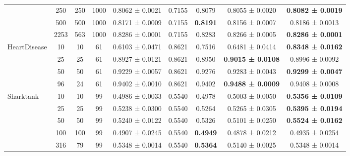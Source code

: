 \begin{table}
{\begin{tabular}[H]{@{}lcccccccc@{}}
                              & 250   & 250  & 1000 & 0.8062 ± 0.0021      & 0.7155               & 0.8079          & 0.8055 ± 0.0020          & \textbf{0.8082 ± 0.0019} \\
                              & 500   & 500  & 1000 & 0.8171 ± 0.0009      & 0.7155               & \textbf{0.8191} & 0.8156 ± 0.0007          & 0.8186 ± 0.0013          \\
                              & 2253  & 563  & 1000 & 0.8286 ± 0.0001      & 0.7155               & 0.8283          & 0.8266 ± 0.0005          & \textbf{0.8286 ± 0.0001} \\
                              \midrule
\multirow{4}{*}{HeartDisease} & 10    & 10   & 61   & 0.6103 ± 0.0471      & 0.8621               & 0.7516          & 0.6481 ± 0.0414          & \textbf{0.8348 ± 0.0162} \\
                              & 25    & 25   & 61   & 0.8927 ± 0.0121      & 0.8621               & 0.8950          & \textbf{0.9015 ± 0.0108} & 0.8996 ± 0.0092          \\
                              & 50    & 50   & 61   & 0.9229 ± 0.0057      & 0.8621               & 0.9276          & 0.9283 ± 0.0043          & \textbf{0.9299 ± 0.0047} \\
                              & 96    & 24   & 61   & 0.9402 ± 0.0010      & 0.8621               & 0.9402          & \textbf{0.9488 ± 0.0009} & 0.9408 ± 0.0008          \\
                              \midrule
\multirow{5}{*}{Sharktank}    & 10    & 10   & 99   & 0.4986 ± 0.0033      & 0.5540               & 0.4978          & 0.5003 ± 0.0050          & \textbf{0.5356 ± 0.0109} \\
                              & 25    & 25   & 99   & 0.5238 ± 0.0300      & 0.5540               & 0.5264          & 0.5265 ± 0.0305          & \textbf{0.5395 ± 0.0194} \\
                              & 50    & 50   & 99   & 0.5240 ± 0.0122      & 0.5540               & 0.5326          & 0.5101 ± 0.0250          & \textbf{0.5524 ± 0.0162} \\
                              & 100   & 100  & 99   & 0.4907 ± 0.0245      & 0.5540               & \textbf{0.4949} & 0.4878 ± 0.0212          & 0.4935 ± 0.0254          \\
                              & 316   & 79   & 99   & 0.5348 ± 0.0014      & 0.5540               & \textbf{0.5364} & 0.5140 ± 0.0025          & 0.5348 ± 0.0014          \\

\end{tabular}}
\end{table}
